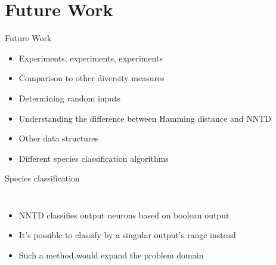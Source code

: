 \section{Future Work}
\begin{frame}{Future Work}
  \begin{itemize}
    \item Experiments, experiments, experiments
    \item Comparison to other diversity measures
    \item Determining random inputs %
    \item Understanding the difference between Hamming distance and NNTD
    \item Other data structures
    \item Different species classification algorithms
  \end{itemize}
\end{frame}

\begin{frame}{Species classification}
  \begin{columns}
    \column{0.5\paperwidth}
    \begin{itemize}
      \item NNTD classifies output neurons based on boolean output
      \item It's possible to classify by a singular output's range instead
      \item Such a method would expand the problem domain
    \end{itemize}

    \column{0.5\paperwidth}
    \begin{figure}[htbp]
      \centering
      
    \end{figure}
  \end{columns}
\end{frame}
